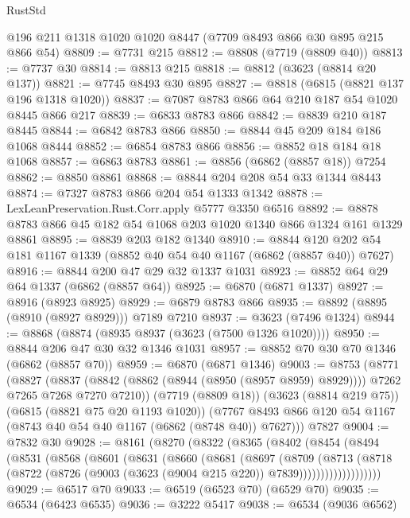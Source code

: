 \begin{lexlean}{RustStd}
\begin{coremodule}
    @196
    @211
    @1318
    @1020
    @1020
    @8447
    (@7709 @8493 @866 @30 @895 @215 @866 @54)
@8809 := @7731 @215
@8812 := @8808 (@7719 (@8809 @40))
@8813 := @7737 @30
@8814 := @8813 @215
@8818 := @8812 (@3623 (@8814 @20 @137))
@8821 := @7745 @8493 @30 @895
@8827 := @8818 (@6815 (@8821 @137 @196 @1318 @1020))
@8837 := @7087 @8783 @866 @64 @210 @187 @54 @1020 @8445 @866 @217
@8839 := @6833 @8783 @866
@8842 := @8839 @210 @187 @8445
@8844 := @6842 @8783 @866
@8850 := @8844 @45 @209 @184 @186 @1068 @8444
@8852 := @6854 @8783 @866
@8856 := @8852 @18 @184 @18 @1068
@8857 := @6863 @8783
@8861 := @8856 (@6862 (@8857 @18)) @7254
@8862 := @8850 @8861
@8868 := @8844 @204 @208 @54 @33 @1344 @8443
@8874 := @7327 @8783 @866 @204 @54 @1333 @1342
@8878 := LexLeanPreservation.Rust.Corr.apply @5777 @3350 @6516
@8892 := @8878 @8783 @866 @45 @182 @54 @1068 @203 @1020 @1340 @866 @1324 @161 @1329 @8861
@8895 := @8839 @203 @182 @1340
@8910 := @8844 @120 @202 @54 @181 @1167 @1339 (@8852 @40 @54 @40 @1167 (@6862 (@8857 @40)) @7627)
@8916 := @8844 @200 @47 @29 @32 @1337 @1031
@8923 := @8852 @64 @29 @64 @1337 (@6862 (@8857 @64))
@8925 := @6870 (@6871 @1337)
@8927 := @8916 (@8923 @8925)
@8929 := @6879 @8783 @866
@8935 := @8892 (@8895 (@8910 (@8927 @8929))) @7189 @7210
@8937 := @3623 (@7496 @1324)
@8944 := @8868 (@8874 (@8935 @8937 (@3623 (@7500 @1326 @1020))))
@8950 := @8844 @206 @47 @30 @32 @1346 @1031
@8957 := @8852 @70 @30 @70 @1346 (@6862 (@8857 @70))
@8959 := @6870 (@6871 @1346)
@9003 := @8753
    (@8771
      (@8827
        (@8837 (@8842 (@8862 (@8944 (@8950 (@8957 @8959) @8929)))) @7262 @7265 @7268 @7270 @7210))
      (@7719 (@8809 @18))
      (@3623 (@8814 @219 @75))
      (@6815 (@8821 @75 @20 @1193 @1020))
      (@7767 @8493 @866 @120 @54 @1167 (@8743 @40 @54 @40 @1167 (@6862 (@8748 @40)) @7627)))
    @7827
@9004 := @7832 @30
@9028 := @8161
    (@8270
      (@8322
        (@8365
          (@8402
            (@8454
              (@8494
                (@8531
                  (@8568
                    (@8601
                      (@8631
                        (@8660
                          (@8681
                            (@8697
                              (@8709
                                (@8713
                                  (@8718
                                    (@8722
                                      (@8726
                                        (@9003 (@3623 (@9004 @215 @220)) @7839)))))))))))))))))))
@9029 := @6517 @70
@9033 := @6519 (@6523 @70) (@6529 @70)
@9035 := @6534 (@6423 @6535)
@9036 := @3222 @5417
@9038 := @6534 (@9036 @6562)

\end{coremodule}
\end{lexlean}
